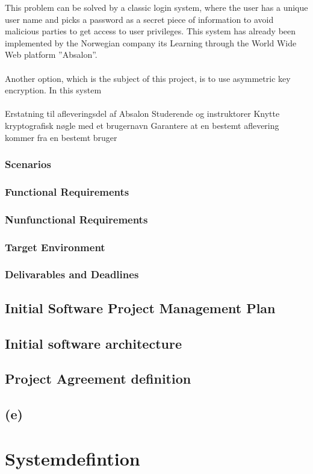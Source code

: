 \documentclass[11pt,a4paper]{article}
\begin{document}
This problem can be solved by a classic login system, where the user has a unique user name and picks a password as a secret piece of information to avoid malicious parties to get access to user privileges. This system has already been implemented by the Norwegian company its Learning through the World Wide Web platform ''Absalon''.\\\\

Another option, which is the subject of this project, is to use asymmetric key encryption. In this system \\\\

Erstatning til afleveringsdel af Absalon
Studerende og instruktorer
Knytte kryptografisk nøgle med et brugernavn
Garantere at en bestemt aflevering kommer fra en bestemt bruger
\subsubsection{Scenarios}
\subsubsection{Functional Requirements}
\subsubsection{Nunfunctional Requirements}
\subsubsection{Target Environment}
\subsubsection{Delivarables and Deadlines}
\subsection{Initial Software Project Management Plan}
\subsection{Initial software
architecture}
\subsection{Project Agreement definition}
\subsection{(e)}
\section{Systemdefintion}
\end{document}
